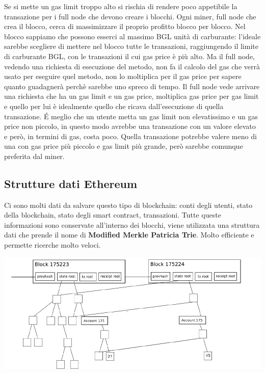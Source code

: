 Se si mette un gas limit troppo alto si rischia di rendere poco appetibile la transazione per i full node che devono creare i blocchi. Ogni miner, full node che crea il blocco, cerca di massimizzare il proprio profitto blocco per blocco. Nel blocco sappiamo che possono esserci al massimo BGL unità di carburante: l'ideale sarebbe scegliere di mettere nel blocco tutte le transazioni, raggiungendo il limite di carburante BGL, con le transazioni il cui gas price è più alto. Ma il full node, vedendo una richiesta di esecuzione del metodo, non fa il calcolo del gas che verrà usato per eseguire quel metodo, non lo moltiplica per il gas price per sapere quanto guadagnerà perchè sarebbe uno spreco di tempo. Il full node vede arrivare una richiesta che ha un gas limit e un gas price, moltiplica gas price per gas limit e quello per lui è idealmente quello che ricava dall'esecuzione di quella transazione. \'E meglio che un utente metta un gas limit non elevatissimo e un gas price non piccolo, in questo modo avrebbe una transazione con un valore elevato e però, in termini di gas, costa poco. Quella transazione potrebbe valere meno di una con gas price più piccolo e gas limit più grande, però sarebbe comunque preferita dal miner. 


\subsection{Strutture dati Ethereum}
Ci sono molti dati da salvare questo tipo di blockchain: conti degli utenti, stato della blockchain, stato degli smart contract, transazioni. Tutte queste informazioni sono conservate all'interno dei blocchi, viene utilizzata una struttura dati che prende il nome di \textbf{Modified Merkle Patricia Trie}. Molto efficiente e permette ricerche molto veloci.  

\begin{center}
    \includegraphics[scale=0.4]{Images/Blockchain/MerkleProofs.jpg}
\end{center}

